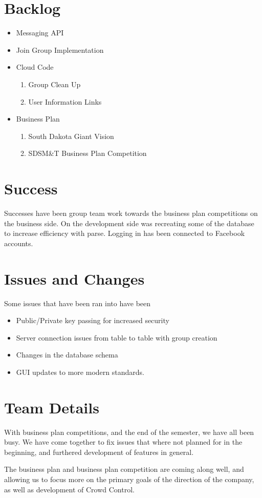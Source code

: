 \documentclass[11pt]{article}
\begin{document}
\section*{Backlog}

	\begin{itemize}
	\item Messaging API
	\item Join Group Implementation
	\item Cloud Code
	\begin{enumerate}
	\item Group Clean Up
	\item User Information Links
	\end{enumerate}
	\item Business Plan
	\begin{enumerate}
	\item South Dakota Giant Vision
	\item SDSM\&T Business Plan Competition
	\end{enumerate}

	\end{itemize}

\section*{Success}
Successes have been group team work towards the business plan competitions on the business side. On the development side was recreating some of the database to increase efficiency with parse. Logging in has been connected to Facebook accounts.


\section*{Issues and Changes}
Some issues that have been ran into have been

	\begin{itemize}
	\item Public/Private key passing for increased security
	\item Server connection issues from table to table with group creation
	\item Changes in the database schema
	\item GUI updates to more modern standards.
	\end{itemize}




	
\section*{Team Details}
With business plan competitions, and the end of the semester, we have all been busy. We have come together to fix issues that where not planned for in the beginning, and furthered development of features in general.

The business plan and business plan competition are coming along well, and allowing us to focus more on the primary goals of the direction of the company, as well as development of Crowd Control.
\end{document}
